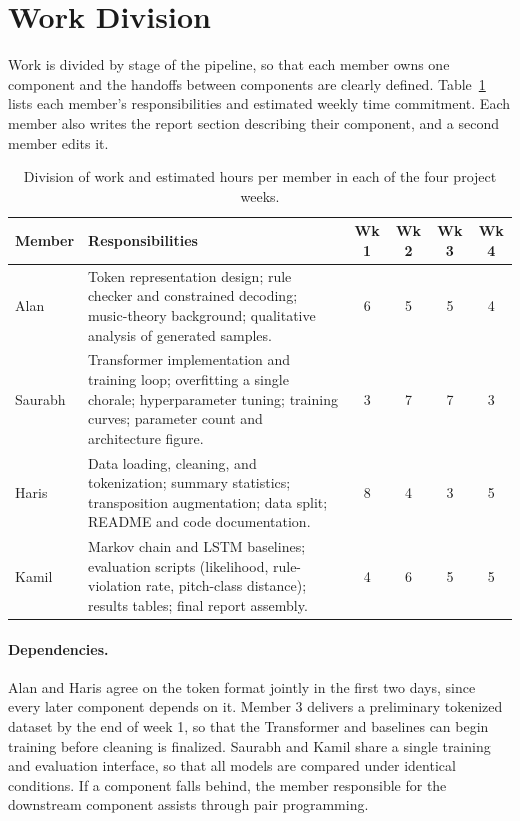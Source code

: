 \documentclass{article}
\begin{document}
\section{Work Division}

Work is divided by stage of the pipeline, so that each member owns one component and the handoffs between components are clearly defined. Table~\ref{tab:work} lists each member's responsibilities and estimated weekly time commitment. Each member also writes the report section describing their component, and a second member edits it.

\begin{table}[t]
  \centering
  \caption{Division of work and estimated hours per member in each of the four project weeks.}
  \label{tab:work}
  \small
  \begin{tabular}{p{1.9cm}p{6.4cm}cccc}
    \toprule
    Member & Responsibilities & Wk 1 & Wk 2 & Wk 3 & Wk 4 \\
    \midrule
    Alan & Token representation design; rule checker and constrained decoding; music-theory background; qualitative analysis of generated samples. & 6 & 5 & 5 & 4 \\
    Saurabh & Transformer implementation and training loop; overfitting a single chorale; hyperparameter tuning; training curves; parameter count and architecture figure. & 3 & 7 & 7 & 3 \\
    Haris & Data loading, cleaning, and tokenization; summary statistics; transposition augmentation; data split; README and code documentation. & 8 & 4 & 3 & 5 \\
    Kamil & Markov chain and LSTM baselines; evaluation scripts (likelihood, rule-violation rate, pitch-class distance); results tables; final report assembly. & 4 & 6 & 5 & 5 \\
    \bottomrule
  \end{tabular}
\end{table}

\paragraph{Dependencies.} Alan and Haris agree on the token format jointly in the first two days, since every later component depends on it. Member 3 delivers a preliminary tokenized dataset by the end of week 1, so that the Transformer and baselines can begin training before cleaning is finalized. Saurabh and Kamil share a single training and evaluation interface, so that all models are compared under identical conditions. If a component falls behind, the member responsible for the downstream component assists through pair programming.
\end{document}
